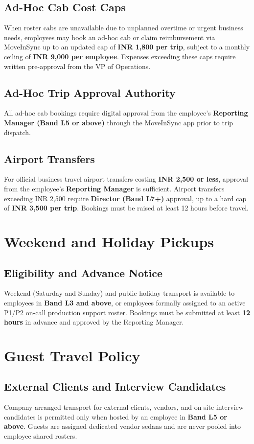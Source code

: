 \documentclass[11pt,a4paper]{article}
\begin{document}
\subsection{Ad-Hoc Cab Cost Caps}
When roster cabs are unavailable due to unplanned overtime or urgent business needs, employees may book an ad-hoc cab or claim reimbursement via MoveInSync up to an updated cap of \textbf{INR 1,800 per trip}, subject to a monthly ceiling of \textbf{INR 9,000 per employee}. Expenses exceeding these caps require written pre-approval from the VP of Operations.

\subsection{Ad-Hoc Trip Approval Authority}
All ad-hoc cab bookings require digital approval from the employee's \textbf{Reporting Manager (Band L5 or above)} through the MoveInSync app prior to trip dispatch.

\subsection{Airport Transfers}
For official business travel airport transfers costing \textbf{INR 2,500 or less}, approval from the employee's \textbf{Reporting Manager} is sufficient. Airport transfers exceeding INR 2,500 require \textbf{Director (Band L7+)} approval, up to a hard cap of \textbf{INR 3,500 per trip}. Bookings must be raised at least 12 hours before travel.

\section{Weekend and Holiday Pickups}
\subsection{Eligibility and Advance Notice}
Weekend (Saturday and Sunday) and public holiday transport is available to employees in \textbf{Band L3 and above}, or employees formally assigned to an active P1/P2 on-call production support roster. Bookings must be submitted at least \textbf{12 hours} in advance and approved by the Reporting Manager.

\section{Guest Travel Policy}
\subsection{External Clients and Interview Candidates}
Company-arranged transport for external clients, vendors, and on-site interview candidates is permitted only when hosted by an employee in \textbf{Band L5 or above}. Guests are assigned dedicated vendor sedans and are never pooled into employee shared rosters.
\end{document}
